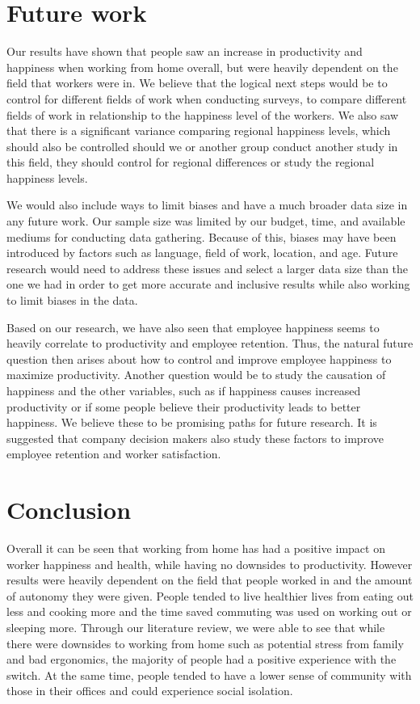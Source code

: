 \documentclass[12pt]{article}
\begin{document}
\section*{Future work}

Our results have shown that people saw an increase in productivity and happiness when working from home overall, but were heavily dependent on the field that workers were in. We believe that the logical next steps would be to control for different fields of work when conducting surveys, to compare different fields of work in relationship to the happiness level of the workers. We also saw that there is a significant variance comparing regional happiness levels, which should also be controlled should we or another group conduct another study in this field, they should control for regional differences or study the regional happiness levels.

We would also include ways to limit biases and have a much broader data size in any future work. Our sample size was limited by our budget, time, and available mediums for conducting data gathering. Because of this, biases may have been introduced by factors such as language, field of work, location, and age. Future research would need to address these issues and select a larger data size than the one we had in order to get more accurate and inclusive results while also working to limit biases in the data. 

Based on our research, we have also seen that employee happiness seems to heavily correlate to productivity and employee retention. Thus, the natural future question then arises about how to control and improve employee happiness to maximize productivity. Another question would be to study the causation of happiness and the other variables, such as if happiness causes increased productivity or if some people believe their productivity leads to better happiness. We believe these to be promising paths for future research. It is suggested that company decision makers also study these factors to improve employee retention and worker satisfaction.

\section*{Conclusion}

Overall it can be seen that working from home has had a positive impact on worker happiness and health, while having no downsides to productivity. However results were heavily dependent on the field that people worked in and the amount of autonomy they were given. People tended to live healthier lives from eating out less and cooking more and the time saved commuting was used on working out or sleeping more. Through our literature review, we were able to see that while there were downsides to working from home such as potential stress from family and bad ergonomics, the majority of people had a positive experience with the switch. At the same time, people tended to have a lower sense of community with those in their offices and could experience social isolation. 
\end{document}
